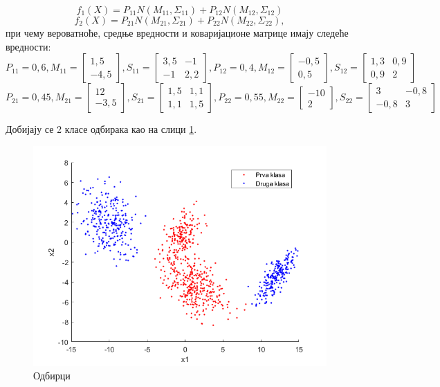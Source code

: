 $$f_1(X) = P_{11} N(M_{11}, \Sigma_{11}) + P_{12} N(M_{12}, \Sigma_{12})$$
$$f_2(X) = P_{21} N(M_{21}, \Sigma_{21}) + P_{22} N(M_{22}, \Sigma_{22}),$$
при чему вероватноће, средње вредности и коваријационе матрице имају следеће вредности:
$$P_{11} = 0,6,  M_{11} = \begin{bmatrix}
   1,5\\
   -4,5
\end{bmatrix}, 
S_{11} = \begin{bmatrix}
				   3,5 & -1\\
				   -1 & 2,2
				\end{bmatrix},
P_{12} = 0,4,  M_{12} = \begin{bmatrix}
										   -0,5\\
										   0,5
										\end{bmatrix}, 
S_{12} = \begin{bmatrix}
				   1,3 & 0,9\\
			   	0,9 &  2
				\end{bmatrix}
$$				
$$P_{21} = 0,45,  M_{21} = \begin{bmatrix}
   12\\
   -3,5
\end{bmatrix}, 
S_{21} = \begin{bmatrix}
				   1,5 & 1,1\\
				   1,1 & 1,5
				\end{bmatrix},
P_{22} = 0,55,  M_{22} = \begin{bmatrix}
										   -10\\
										   2
										\end{bmatrix}, 
S_{22} = \begin{bmatrix}
				   3 & -0,8\\
			   	-0,8 &  3
				\end{bmatrix}
$$

Добијају се 2 класе одбирака као на слици \ref{fig:OdbirciQuad}.

\begin{figure}[htb!]
\includegraphics[scale=.8]{pictures/4/OdbirciQuad}
\caption{Одбирци}\label{fig:OdbirciQuad}
\end{figure}

